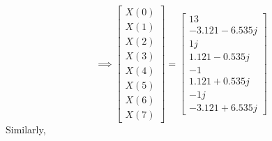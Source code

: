\documentclass[journal,12pt,twocolumn]{IEEEtran}
\renewcommand\thesection{\arabic{section}}
\begin{document}
\begin{enumerate}[label=\thesection.\arabic*.,ref=\thesection.\theenumi]
\begin{equation}
\implies
\begin{bmatrix}
X(0) \\
X(1) \\
X(2) \\
X(3) \\
X(4) \\
X(5) \\
X(6) \\
X(7)
\end{bmatrix}
=
\begin{bmatrix}
13 \\
-3.121 - 6.535j \\
1j \\
1.121 - 0.535j \\
-1 \\
1.121 + 0.535j \\
-1j \\
-3.121 + 6.535j
\end{bmatrix}
\end{equation}
Similarly,


\end{enumerate}
\end{document}
